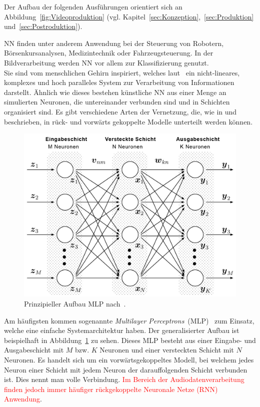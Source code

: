 \documentclass[times, 11pt,twocolumn]{article}
\begin{document}
Der Aufbau der folgenden Ausführungen orientiert sich an Abbildung~\ref{fig:Videoproduktion} (vgl. Kapitel~\ref{sec:Konzeption},~\ref{sec:Produktion} und~\ref{sec:Postroduktion}).



 \label{sec:NeuronaleNetze}
NN finden unter anderem Anwendung bei der Steuerung von Robotern, Börsenkursanalysen, Medizintechnik oder Fahrzeugsteuerung. In der Bildverarbeitung werden NN vor allem zur Klassifizierung genutzt. \\
Sie sind vom menschlichen Gehirn inspiriert, welches laut~\cite{NNHaykin} ein nicht-lineares, komplexes und hoch paralleles System zur Verarbeitung von Informationen darstellt. Ähnlich wie dieses bestehen künstliche NN aus einer Menge an simulierten Neuronen, die untereinander verbunden sind und in Schichten organisiert sind. Es gibt verschiedene Arten der Vernetzung, die, wie in \cite{NNHaykin} und \cite{NNStanley} beschrieben, in rück- und vorwärts gekoppelte Modelle unterteilt werden können.\\
\begin{figure}
	\flushleft
	\includegraphics[width=\columnwidth]{Bilder/structure-mlp.jpg}
	\caption{Prinzipieller Aufbau MLP nach~\cite{MDPI}.}
	\label{fig:MLP}
\end{figure}
Am häufigsten kommen sogenannte \textit{Multilayer Perceptrons}~(MLP)~\cite{NNBraun}\cite{NNNauck}\cite{NNStanley} zum Einsatz, welche eine einfache Systemarchitektur haben. Der generalisierter Aufbau ist beispielhaft in Abbildung~\ref{fig:MLP} zu sehen. Dieses MLP besteht aus einer Eingabe- und Ausgabeschicht mit $M$ bzw. $K$ Neuronen und einer versteckten Schicht mit $N$ Neuronen. Es handelt sich um ein vorwärtsgekoppeltes Modell, bei welchem jedes Neuron einer Schicht mit jedem Neuron der darauffolgenden Schicht verbunden ist. Dies nennt man volle Verbindung. \textcolor{red}{Im Bereich der Audiodatenverarbeitung finden jedoch immer häufiger rückgekoppelte Neuronale Netze (RNN) Anwendung}. \\
\end{document}
